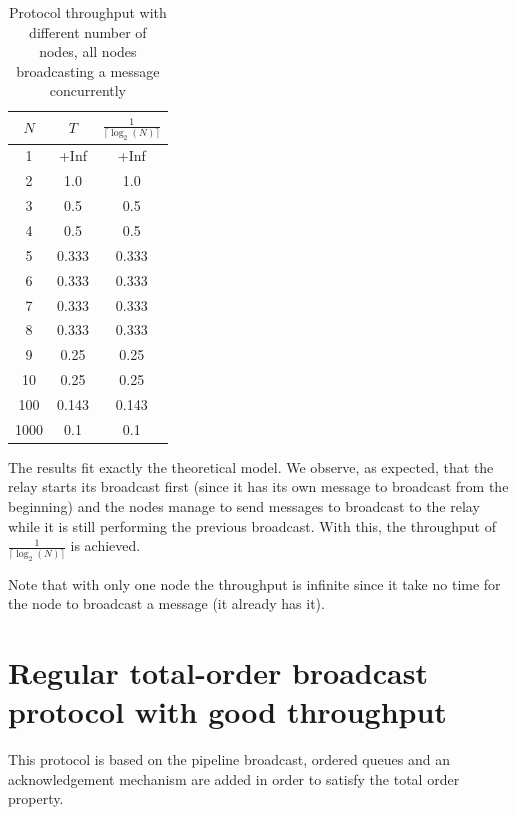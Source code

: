 \documentclass[a4paper]{article}
\begin{document}
\begin{table}[H]
    \centering
    \begin{tabular}{|c|c|c|}
        \hline
        $N$   & $T$  & $\frac{1}{\lceil\log_2(N)\rceil}$ \\
        \hline
        1     & +Inf   & +Inf   \\
        2     & 1.0    & 1.0    \\
        3     & 0.5    & 0.5    \\
        4     & 0.5    & 0.5    \\
        5     & 0.333  & 0.333  \\
        6     & 0.333  & 0.333  \\
        7     & 0.333  & 0.333  \\
        8     & 0.333  & 0.333  \\
        9     & 0.25   & 0.25   \\
        10    & 0.25   & 0.25   \\
        100   & 0.143  & 0.143  \\
        1000  & 0.1    & 0.1    \\
        \hline
    \end{tabular}
    \caption{Protocol throughput with different number of nodes, all nodes broadcasting a message concurrently}
    \label{table:thr}
\end{table}

The results fit exactly the theoretical model. We observe, as expected, that
the relay starts its broadcast first (since it has its own message to
broadcast from the beginning) and the nodes manage to send messages to
broadcast to the relay while it is still performing the previous broadcast.
With this, the throughput of $\frac{1}{\lceil\log_2(N)\rceil}$ is achieved.

Note that with only one node the throughput is infinite since it take no time
for the node to broadcast a message (it already has it).

\section{Regular total-order broadcast protocol with good throughput}
\label{sec:throughputTO}
This protocol is based on the pipeline broadcast, ordered queues and an
acknowledgement mechanism are added in order to satisfy the total order
property.
\end{document}
